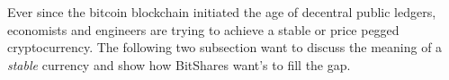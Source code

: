 Ever since the bitcoin blockchain initiated the age of decentral public
ledgers, economists and engineers are trying to achieve a stable or price
pegged cryptocurrency. The following two subsection want to discuss the meaning
of a \emph{stable} currency and show how BitShares want's to fill the gap.
